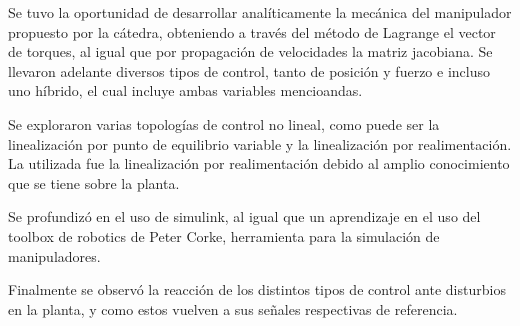 %
%
%

Se tuvo la oportunidad de desarrollar analíticamente la mecánica del manipulador propuesto por la cátedra, obteniendo a través del método de Lagrange el vector de torques, al igual que por propagación de velocidades la matriz jacobiana. Se llevaron adelante diversos tipos de control, tanto de posición y fuerzo e incluso uno híbrido, el cual incluye ambas variables mencioandas.

Se exploraron varias topologías de control no lineal, como puede ser la linealización por punto de equilibrio variable y la linealización por realimentación. La utilizada fue la linealización por realimentación debido al amplio conocimiento que se tiene sobre la planta. 

Se profundizó en el uso de simulink, al igual que un aprendizaje en el uso del toolbox de robotics de Peter Corke, herramienta para la simulación de manipuladores. 

Finalmente se observó la reacción de los distintos tipos de control ante disturbios en la planta, y como estos vuelven a sus señales respectivas de referencia.

%